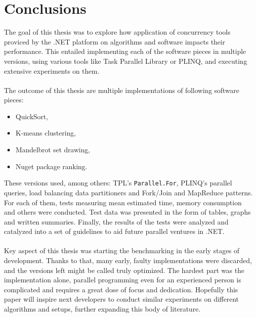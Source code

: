 \chapter{Conclusions}
The goal of this thesis was to explore how application of concurrency tools proviced by the .NET platform
on algorithms and software impacts their performance. This entailed implementing each of the software pieces
in multiple versions, using various tools like Task Parallel Library or PLINQ, and executing extensive experiments on them.
\\ \\ 
The outcome of this thesis are multiple implementations of following software pieces: 
\begin{itemize}
	\item QuickSort,
	\item K-means clustering,
	\item Mandelbrot set drawing,
	\item Nuget package ranking.
\end{itemize}

These versions used, among others: TPL's \texttt{Parallel.For}, PLINQ's parallel queries, load balancing data partitioners and Fork/Join and MapReduce patterns.
For each of them, tests measuring mean estimated time, memory consumption and others were conducted. 
Test data was presented in the form of tables, graphs and written summaries. 
Finally, the results of the tests were analyzed and catalyzed into a set of guidelines to aid future parallel ventures in .NET. 
\\ \\ 
Key aspect of this thesis was starting the benchmarking in the early stages of development. Thanks to that, many early, faulty implementations were discarded, and the versions left might be called truly optimized. The hardest part was the implementation alone, parallel programming even for an experienced person is complicated and requires a great dose of focus and dedication. Hopefully this paper will inspire next developers to conduct similar experiments on different algorithms and setups, further expanding this body of literature. 